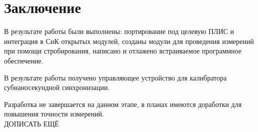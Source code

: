 \chapter*{Заключение} \label{ch-conclusion}

В результате работы были выполнены: портирование под целевую ПЛИС и интеграция в СнК открытых модулей, созданы
модули для проведения измерений при помощи стробирования, написано и отлажено встраиваемое программное обеспечение.

В результате работы получено управляющее устройство для калибратора субнаносекундной синхронизации.

Разработка не завершается на данном этапе, в планах имеются доработки для повышения точности измерений.\\

ДОПИСАТЬ ЕЩЁ